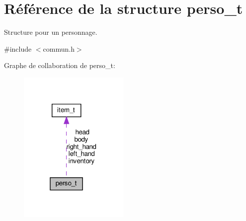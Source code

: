 \hypertarget{structperso__t}{}\section{Référence de la structure perso\+\_\+t}
\label{structperso__t}


Structure pour un personnage.  




{\ttfamily \#include $<$commun.\+h$>$}



Graphe de collaboration de perso\+\_\+t\+:\nopagebreak
\begin{figure}[H]
\begin{center}
\leavevmode
\includegraphics[width=151pt]{structperso__t__coll__graph}
\end{center}
\end{figure}
